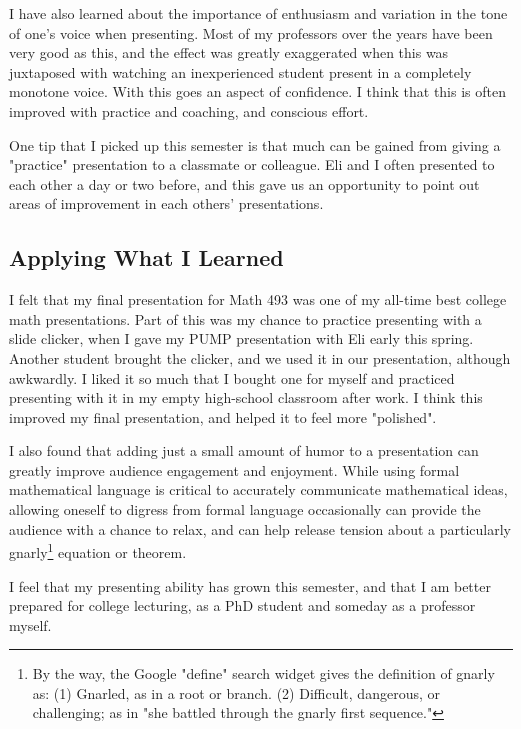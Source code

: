 \documentclass[a5paper]{article}
\theoremstyle{definition}%
\numberwithin{exercise}{section}
\theoremstyle{remark}%
\begin{document}
I have also learned about the importance of enthusiasm and variation in the tone of one's voice when presenting. Most of my professors over the years have been very good as this, and the effect was greatly exaggerated when this was juxtaposed with watching an inexperienced student present in a completely monotone voice. With this goes an aspect of confidence. I think that this is often improved with practice and coaching, and conscious effort. 

One tip that I picked up this semester is that much can be gained from giving a "practice" presentation to a classmate or colleague. Eli and I often presented to each other a day or two before, and this gave us an opportunity to point out areas of improvement in each others' presentations. 

\subsection{Applying What I Learned}

I felt that my final presentation for Math 493 was one of my all-time best college math presentations. Part of this was my chance to practice presenting with a slide clicker, when I gave my PUMP presentation with Eli early this spring. Another student brought the clicker, and we used it in our presentation, although awkwardly. I liked it so much that I bought one for myself and practiced presenting with it in my empty high-school classroom after work. I think this improved my final presentation, and helped it to feel more "polished". 

I also found that adding just a small amount of humor to a presentation can greatly improve audience engagement and enjoyment. While using formal mathematical language is critical to accurately communicate mathematical ideas, allowing oneself to digress from formal language occasionally can provide the audience with a chance to relax, and can help release tension about a particularly gnarly\footnote{By the way, the Google "define" search widget gives the definition of gnarly as: (1) Gnarled, as in a root or branch. (2) Difficult, dangerous, or challenging; as in "she battled through the gnarly first sequence."} equation or theorem. 

I feel that my presenting ability has grown this semester, and that I am better prepared for college lecturing, as a PhD student and someday as a professor myself. 
\end{document}
